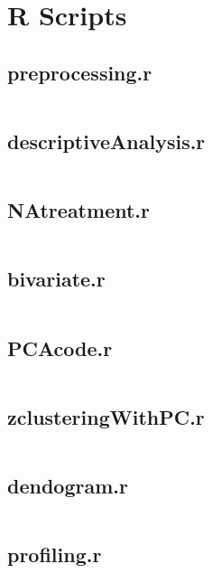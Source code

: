 

\section{R Scripts}%
\label{sec:r_scripts}

\newcommand{\mintedfile}[1]{
    \subsection{#1}%
    \label{sub:#1}
    \inputminted{r}{../../analysis/#1}
    \pagebreak
}


\mintedfile{preprocessing.r}
\mintedfile{descriptiveAnalysis.r}
\mintedfile{NAtreatment.r}
\mintedfile{bivariate.r}
\mintedfile{PCAcode.r}
\mintedfile{zclusteringWithPC.r}
\mintedfile{dendogram.r}
\mintedfile{profiling.r}
